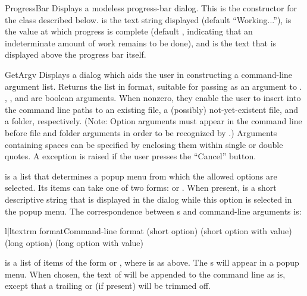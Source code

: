 \begin{funcdesc}{ProgressBar}{}
Displays a modeless progress-bar dialog. This is the constructor for the
 class described below.  is the text
string displayed (default ``Working...''),  is the value at
which progress is complete (default , indicating that an
indeterminate amount of work remains to be done), and  is
the text that is displayed above the progress bar itself.
\end{funcdesc}


\begin{funcdesc}{GetArgv}{}
Displays a dialog which aids the user in constructing a command-line
argument list.  Returns the list in  format, suitable for
passing as an argument to .  ,
, and  are boolean arguments.  When
nonzero, they enable the user to insert into the command line paths to
an existing file, a (possibly) not-yet-existent file, and a folder,
respectively.  (Note: Option arguments must appear in the command line
before file and folder arguments in order to be recognized by
.)  Arguments containing spaces can be
specified by enclosing them within single or double quotes.  A
 exception is raised if the user presses the
``Cancel'' button.

 is a list that determines a popup menu from which the
allowed options are selected.  Its items can take one of two forms:
 or .  When present,
 is a short descriptive string that is displayed in the
dialog while this option is selected in the popup menu.  The
correspondence between s and command-line arguments is:

\begin{tableii}{l|l}{textrm}{ format}{Command-line format}
       { (short option)}
       { (short option with value)}
       { (long option)}
       { (long option with value)}
\end{tableii}

 is a list of items of the form  or
, where  is as above.  The
s will appear in a popup menu.  When chosen, the text of
 will be appended to the command line as is, except that a
trailing \character{:} or \character{=} (if present) will be trimmed
off.

\end{funcdesc}


